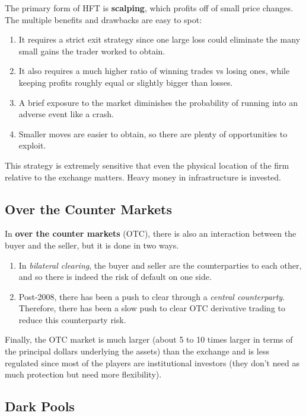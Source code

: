 \documentclass{article}
\begin{document}
      The primary form of HFT is \textbf{scalping}, which profits off of small price changes. The multiple benefits and drawbacks are easy to spot: 
      \begin{enumerate}
          \item It requires a strict exit strategy since one large loss could eliminate the many small gains the trader worked to obtain. 
          \item It also requires a much higher ratio of winning trades vs losing ones, while keeping profits roughly equal or slightly bigger than losses. 
          \item A brief exposure to the market diminishes the probability of running into an adverse event like a crash. 
          \item Smaller moves are easier to obtain, so there are plenty of opportunities to exploit. 
      \end{enumerate}
      This strategy is extremely sensitive that even the physical location of the firm relative to the exchange matters. Heavy money in infrastructure is invested. 

  \subsection{Over the Counter Markets}

    \begin{definition}
      In \textbf{over the counter markets} (OTC), there is also an interaction between the buyer and the seller, but it is done in two ways. 
      \begin{enumerate}
        \item In \textit{bilateral clearing}, the buyer and seller are the counterparties to each other, and so there is indeed the risk of default on one side. 
        \item Post-2008, there has been a push to clear through a \textit{central counterparty}. Therefore, there has been a slow push to clear OTC derivative trading to reduce this counterparty risk. 
      \end{enumerate}
      Finally, the OTC market is much larger (about 5 to 10 times larger in terms of the principal dollars underlying the assets) than the exchange and is less regulated since most of the players are institutional investors (they don't need as much protection but need more flexibility).  
    \end{definition}

  \subsection{Dark Pools}
\end{document}
